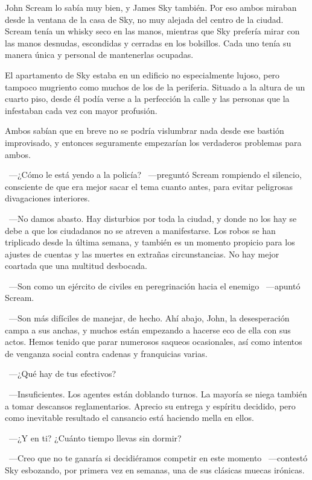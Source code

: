 John Scream lo sabía muy bien, y James Sky también. Por eso ambos miraban desde la ventana de la casa de Sky, no muy alejada del centro de la ciudad. Scream tenía un whisky seco en las manos, mientras que Sky prefería mirar con las manos desnudas, escondidas y cerradas en los bolsillos. Cada uno tenía su manera única y personal de mantenerlas ocupadas.

El apartamento de Sky estaba en un edificio no especialmente lujoso, pero tampoco mugriento como muchos de los de la periferia. Situado a la altura de un cuarto piso, desde él podía verse a la perfección la calle y las personas que la infestaban cada vez con mayor profusión.

Ambos sabían que en breve no se podría vislumbrar nada desde ese bastión improvisado, y entonces seguramente empezarían los verdaderos problemas para ambos.

~---¿Cómo le está yendo a la policía? ~---preguntó Scream rompiendo el silencio, consciente de que era mejor sacar el tema cuanto antes, para evitar peligrosas divagaciones interiores.

~---No damos abasto. Hay disturbios por toda la ciudad, y donde no los hay se debe a que los ciudadanos no se atreven a manifestarse. Los robos se han triplicado desde la última semana, y también es un momento propicio para los ajustes de cuentas y las muertes en extrañas circunstancias. No hay mejor coartada que una multitud desbocada.

~---Son como un ejército de civiles en peregrinación hacia el enemigo ~---apuntó Scream.

~---Son más difíciles de manejar, de hecho. Ahí abajo, John, la desesperación campa a sus anchas, y muchos están empezando a hacerse eco de ella con sus actos. Hemos tenido que parar numerosos saqueos ocasionales, así como intentos de venganza social contra cadenas y franquicias varias.

~---¿Qué hay de tus efectivos?

~---Insuficientes. Los agentes están doblando turnos. La mayoría se niega también a tomar descansos reglamentarios. Aprecio su entrega y espíritu decidido, pero como inevitable resultado el cansancio está haciendo mella en ellos.

~---¿Y en ti? ¿Cuánto tiempo llevas sin dormir?

~---Creo que no te ganaría si decidiéramos competir en este momento ~---contestó Sky esbozando, por primera vez en semanas, una de sus clásicas muecas irónicas.

